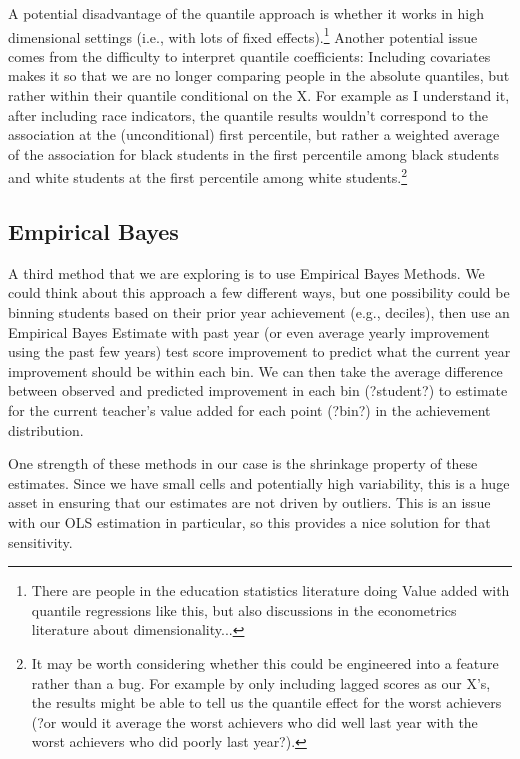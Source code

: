 \documentclass[letterpaper,12pt]{article}
\begin{document}
A potential disadvantage of the quantile approach is whether it works in high dimensional settings (i.e., with lots of fixed effects).\footnote{There are people in the education statistics literature doing Value added with quantile regressions like this, but also discussions in the econometrics literature about dimensionality...} Another potential issue comes from the difficulty to interpret quantile coefficients: Including covariates makes it so that we are no longer comparing people in the absolute quantiles, but rather within their quantile conditional on the X. For example as I understand it, after including race indicators, the quantile results wouldn't correspond to the association at the (unconditional) first percentile, but rather a weighted average of the association for black students in the first percentile among black students and white students at the first percentile among white students.\footnote{It may be worth considering whether this could be engineered into a feature rather than a bug. For example by only including lagged scores as our X's, the results might be able to tell us the quantile effect for the worst achievers (?or would it average the worst achievers who did well last year with the worst achievers who did poorly last year?).}


\subsection{Empirical Bayes}

A third method that we are exploring is to use Empirical Bayes Methods. We could think about this approach a few different ways, but one possibility could be binning students based on their prior year achievement (e.g., deciles), then use an Empirical Bayes Estimate with past year (or even average yearly improvement using the past few years) test score improvement to predict what the current year improvement should be within each bin. We can then take the average difference between observed and predicted improvement in each bin (?student?) to estimate for the current teacher's value added for each point (?bin?) in the achievement distribution.

One strength of these methods in our case is the shrinkage property of these estimates. Since we have small cells and potentially high variability, this is a huge asset in ensuring that our estimates are not driven by outliers. This is an issue with our OLS estimation in particular, so this provides a nice solution for that sensitivity.
\end{document}
